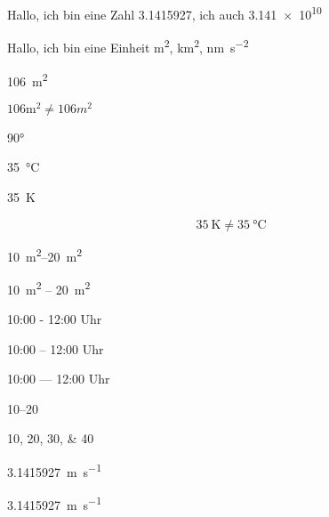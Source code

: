 \documentclass[ngerman]{scrartcl}
\newcommand{\sirange}[3]{\SI{#1}{#3} -- \SI{#2}{#3}}
\begin{document}
Hallo, ich bin eine Zahl \num{3,1415927}, ich auch \num{3,141e10}

Hallo, ich bin eine Einheit \si{m^2}, \si{\kilo\meter^2}, \si{\nano\meter\per\second^2}

\SI{106}{m^2} %

\(106 \text{m}^2 \not= 106 m^2  \) %

\ang{90} %

\SI{35}{\celsius} %

\SI{35}{\kelvin} %


\begin{equation}
\SI{35}{\kelvin} \not= \SI{35}{\celsius}
\end{equation}

\SIrange{10}{20}{m^2}

\sirange{10}{20}{m^2}

10:00 - 12:00 Uhr %

10:00 -- 12:00 Uhr %

10:00 --- 12:00 Uhr %

\numrange{10}{20}

\numlist{10;20;30;40}

\qty[per-mode= fraction]{3,1415927}{\meter\per\second}

\SI[per-mode= fraction]{3,1415927}{\meter\per\second}
\end{document}
